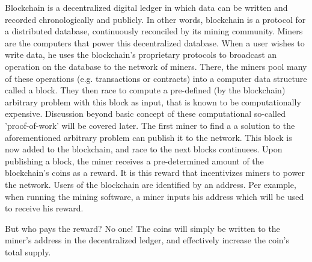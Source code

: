 Blockchain is a decentralized digital ledger in which data can be written and recorded chronologically and publicly.
In other words, blockchain is a protocol for a distributed database, continuously reconciled by its mining community.
Miners are the computers that power this decentralized database.
When a user wishes to write data, he uses the blockchain's proprietary protocols to broadcast an operation on the database
to the network of miners.
There, the miners pool many of these operations (e.g. transactions or contracts) into a computer data structure called a block.
They then race to compute a pre-defined (by the blockchain) arbitrary problem with this block as input,
that is known to be computationally expensive.
Discussion beyond basic concept of these computational so-called 'proof-of-work' will be covered later.
The first miner to find a a solution to the aforementioned arbitrary problem can publish it to the network.
This block is now added to the blockchain, and race to the next blocks continuees.
Upon publishing a block, the miner receives a pre-determined amount of the blockchain's coins as a reward.
It is this reward that incentivizes miners to power the network.
Users of the blockchain are identified by an address.
Per example, when running the mining software, a miner inputs his address which will be used to receive his reward.

But who pays the reward?
No one!
The coins will simply be written to the miner's address in the decentralized ledger, and effectively increase the coin's total supply.
